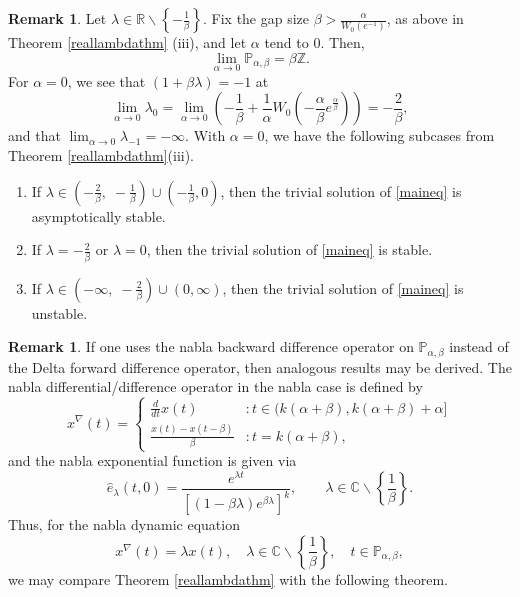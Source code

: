 \documentclass[12pt,reqno]{amsart}
\theoremstyle{plain}
\theoremstyle{definition}
\newtheorem{remark}[theorem]{Remark}
\newcommand{\R}{\ensuremath{\mathbb{R}}}
\newcommand{\Z}{\ensuremath{\mathbb{Z}}}
\newcommand{\C}{\ensuremath{\mathbb{C}}}
\newcommand{\p}{\ensuremath{\mathbb{P}}}
\numberwithin{equation}{section}
\numberwithin{theorem}{section}
\begin{document}
\begin{remark}\label{remark16}
Let $\lambda\in\R\backslash\left\{-\frac{1}{\beta}\right\}$. Fix the gap size $\beta>\frac{\alpha}{W_0(e^{-1})}$, as above in Theorem \ref{reallambdathm} (iii), and let $\alpha$ tend to 0. Then, 
$$ \lim_{\alpha\rightarrow 0}\p_{\alpha,\beta} = \beta\Z. $$
For $\alpha=0$, we see that $(1+\beta\lambda)=-1$ at 
$$ \lim_{\alpha\rightarrow 0}\lambda_{0}=\lim_{\alpha\rightarrow 0}\left(-\frac{1}{\beta}+\frac{1}{\alpha}W_{0}\left(-\frac{\alpha}{\beta}e^{\frac{\alpha}{\beta}}\right)\right)=-\frac{2}{\beta}, $$
and that $\displaystyle\lim_{\alpha\rightarrow 0}\lambda_{-1}=-\infty$. With $\alpha=0$, we have the following subcases from Theorem \ref{reallambdathm}(iii).
\begin{enumerate}				
\item[(a)] If $\lambda\in\left(-\frac{2}{\beta},\; -\frac{1}{\beta}\right)\cup\left(-\frac{1}{\beta},0\right)$, then the trivial solution of \eqref{maineq} is asymptotically stable. 
\item[(b)] If $\lambda=-\frac{2}{\beta}$ or $\lambda=0$, then the trivial solution of \eqref{maineq} is stable.
\item[(c)] If $\lambda\in\left(-\infty,\; -\frac{2}{\beta}\right)\cup(0,\infty)$, then the trivial solution of \eqref{maineq} is unstable.
\end{enumerate}
\end{remark}


\begin{remark}
If one uses the nabla backward difference operator on $\p_{\alpha,\beta}$ instead of the Delta forward difference operator, then analogous results may be derived. The nabla differential/difference operator in the nabla case is defined by
\[ x^{\nabla}(t) = \begin{cases} \frac{d}{dt}x(t) &: t\in(k(\alpha+\beta),k(\alpha+\beta)+\alpha] \\ \frac{x(t)-x(t-\beta)}{\beta} &: t=k(\alpha+\beta), \end{cases} \]
and the nabla exponential function is given via
\begin{equation}\label{nablaexpo}
 \widehat{e}_\lambda(t,0) = \frac{e^{\lambda t}}{[(1-\beta\lambda)e^{\beta\lambda}]^k}, \qquad \lambda\in\C\backslash\left\{\frac{1}{\beta}\right\}.
\end{equation}
Thus, for the nabla dynamic equation
\begin{equation}\label{nabeq}
 x^\nabla(t) = \lambda x(t), \quad \lambda\in\C\backslash\left\{\frac{1}{\beta}\right\}, \quad t\in\p_{\alpha,\beta},
\end{equation}
we may compare Theorem \ref{reallambdathm} with the following theorem.
\end{remark}
\end{document}
